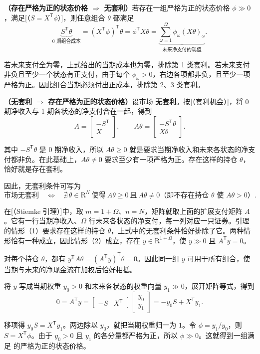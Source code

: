 \begin{solution}[label-content={证明},blank-type=none]


\textbf{（存在严格为正的状态价格 $\Rightarrow$ 无套利）}若存在一组严格为正的状态价格 $\phi\gg0$，满足[（$S=X^{\mathsf T}\phi$）]，则任意组合 $\theta$ 都满足
\[
 \underbrace{S^{\mathsf T}\theta}_{\text{0 期组合成本}}
 =(X^{\mathsf T}\phi)^{\mathsf T}\theta
 =\phi^{\mathsf T}X\theta
 =\underbrace{\sum_{\omega=1}^{\Omega}\phi_\omega(X\theta)_\omega}
 _{\text{未来净支付的现值}}.
\]

若未来支付全为零，上式给出的当期成本也为零，排除第 1 类套利。若未来支付非负且至少一个状态有正支付，由于每个 $\phi_\omega>0$，右边各项都非负，且至少一项严格为正。因此组合当期必须付出正成本，排除第 2、3 类套利。

\textbf{（无套利 $\Rightarrow$ 存在严格为正的状态价格）}设市场 \textbf{无套利}。按[（套利机会）]，将 0 期净收入与 1 期各状态的净支付合在一起，得到
\[
 A=\begin{bmatrix}-S^{\mathsf T}\\ X\end{bmatrix},
 \qquad
 A\theta=\begin{bmatrix}
 -S^{\mathsf T}\theta\\ X\theta
 \end{bmatrix}.
\]

其中 $-S^{\mathsf T}\theta$ 是 0 期净收入，所以 $A\theta\ge0$ 就是要求当期净收入和未来各状态的净支付都非负。在此基础上，$A\theta\ne0$ 要求至少有一项严格为正。存在这样的持仓 $\theta$，恰好就是存在套利。

因此，无套利条件可写为
\[
 \text{市场无套利}
 \quad\Longleftrightarrow\quad
 \nexists\,\theta\in\mathrm R^N\ \text{使得}\ A\theta\ge0\ \text{且}\ A\theta\ne0 \text{（即不存在持仓 $\theta$ 使 $A\theta>0$）}.
\]

在[（Stiemke 引理）]中，取 $m=1+\Omega$、$n=N$，矩阵就取上面的扩展支付矩阵 $A$。它有一行当期净收入、$\Omega$ 行未来各状态的净支付，每一列对应一只证券。引理的情形（1）要求存在这样的持仓 $\theta$，上式中的无套利条件恰好排除了它。两种情形恰有一种成立，因此情形（2）成立，存在 $y\in\mathrm R^{1+\Omega}$，使 $y\gg0$ 且 $A^{\mathsf T}y=0$。

对每个持仓 $\theta$，都有 $y^{\mathsf T}A\theta=(A^{\mathsf T}y)^{\mathsf T}\theta=0$。因此同一组 $y$ 可用于所有组合，使当期与未来的净现金流在加权后恰好相抵。

将 $y$ 写成当期权重 $y_0>0$ 和未来各状态的权重向量 $y_1\gg0$，展开矩阵等式，得到
\[
 0=A^{\mathsf T}y
 =\begin{bmatrix}-S & X^{\mathsf T}\end{bmatrix}
 \begin{bmatrix}y_0\\ y_1\end{bmatrix}
 =-y_0S+X^{\mathsf T}y_1.
\]

移项得 $y_0S=X^{\mathsf T}y_1$。两边除以 $y_0$，就把当期权重归一为 $1$。令 $\phi=y_1/y_0$，则 $S=X^{\mathsf T}\phi$。由于 $y_0>0$ 且 $y_1$ 的各分量都严格为正，所以 $\phi\gg0$。这就得到一组满足 的严格为正的状态价格。
\end{solution}

